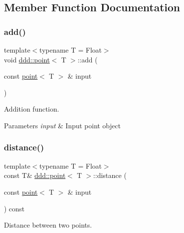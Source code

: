 \subsection{Member Function Documentation}
\mbox{\label{classddd_1_1point_a66ad14a1d50eb4170c874f75b77e8b0b}} 
\subsubsection{\texorpdfstring{add()}{add()}}
{\footnotesize\ttfamily template$<$typename T = Float$>$ \\
void \hyperlink{classddd_1_1point}{ddd\+::point}$<$ T $>$\+::add (\begin{DoxyParamCaption}\item[{const \hyperlink{classddd_1_1point}{point}$<$ T $>$ \&}]{input }\end{DoxyParamCaption})\hspace{0.3cm}{\ttfamily [inline]}}



Addition function. 


\begin{DoxyParams}{Parameters}
{\em input} & Input point object \\
\hline
\end{DoxyParams}
\mbox{\label{classddd_1_1point_a36798ea778572d6145a709e7baf7893f}} 
\subsubsection{\texorpdfstring{distance()}{distance()}\hspace{0.1cm}{\footnotesize\ttfamily [1/3]}}
{\footnotesize\ttfamily template$<$typename T = Float$>$ \\
const T\& \hyperlink{classddd_1_1point}{ddd\+::point}$<$ T $>$\+::distance (\begin{DoxyParamCaption}\item[{const \hyperlink{classddd_1_1point}{point}$<$ T $>$ \&}]{input }\end{DoxyParamCaption}) const\hspace{0.3cm}{\ttfamily [inline]}}



Distance between two points. 


